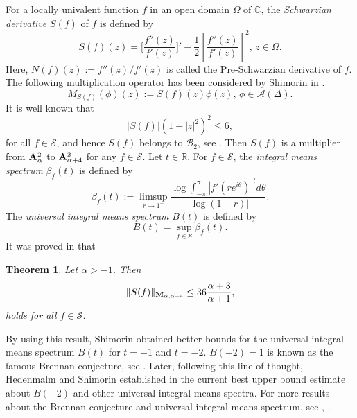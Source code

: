 \documentclass[10pt]{amsart}
\newtheorem{theorem}{Theorem}[section]
\theoremstyle{definition}    %
\numberwithin{equation}{section}
\begin{document}
For a locally univalent function $f$ in an open domain $\Omega$ of $\mathbb{C}$, the {\em Schwarzian derivative} $S(f)$ of $f$ is defined by 
$$S(f)(z)=\bigg[\frac{f''(z)}{f'(z)}\bigg]'-\frac{1}{2}\left[\frac{f''(z)}{f'(z)}\right]^2, \,z\in \Omega.$$
Here, $N(f)(z):= f''(z)/f'(z)$ is called the Pre-Schwarzian derivative of $f$. The following  multiplication operator has been considered by Shimorin in \cite{SS}. 
$$M_{S(f)}(\phi)(z):=S(f)(z)\phi(z),\, \phi\in \mathcal{A}(\Delta).$$
It is well known that
 $$|S(f)|(1-|z|^2)^2\leq 6,$$
 for all $f\in \mathcal{S}$, and hence $S(f)$ belongs to $\mathcal{B}_2$, see \cite{Du}. Then $S(f)$ is a multiplier from ${\bf A}_{\alpha}^2$ to ${\bf A}_{\alpha+4}^2$ for any $f\in \mathcal{S}$. 
Let  $t\in \mathbb{R}$. For $f\in \mathcal{S}$, the {\em integral means spectrum} $\beta_f(t)$ is defined by
\begin{equation}\label{defi}
\beta_f(t):=\limsup_{r \rightarrow 1^{-}}\frac{\log \int_{-\pi}^{\pi} |f'(re^{i\theta})|^{t}d\theta}{|\log(1-r)|}. 
\end{equation}
The {\em universal integral means spectrum} $B(t)$ is defined by
\begin{equation}
B(t)=\sup\limits_{f\in \mathcal{S}} \beta_f(t).\nonumber
\end{equation}
It was proved in \cite{SS} that
\begin{theorem}
Let $\alpha>-1$. Then
$$\|S(f)\|_{{\bf {M}}_{\alpha, \alpha+4}}\leq 36\frac{\alpha+3}{\alpha+1},$$
holds for all $f\in \mathcal{S}$. 
\end{theorem}
By using this result, Shimorin obtained better bounds for the universal integral means spectrum $B(t)$ for $t=-1$ and $t=-2$. $B(-2)=1$ is known as the famous Brennan conjecture, see \cite{GM}. Later, following this line of thought, Hedenmalm and Shimorin established in \cite{HS-1} the current best upper bound estimate about $B(-2)$ and other universal integral means spectra. For more results about the Brennan conjecture and universal integral means spectrum, see \cite{Be}, \cite{HSo}.
\end{document}
